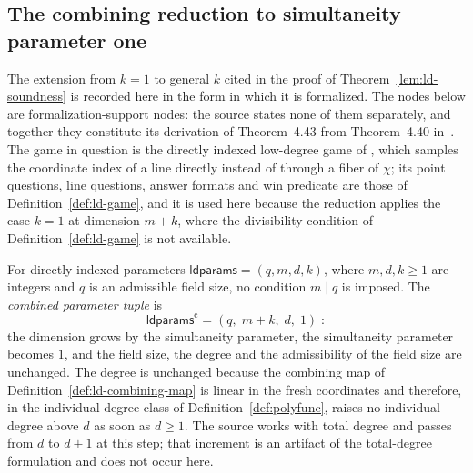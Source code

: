 \subsection{The combining reduction to simultaneity parameter one}
\label{sec:ld-combining-reduction}

The extension from $k = 1$ to general $k$ cited in the proof of
Theorem~\ref{lem:ld-soundness} is recorded here in the form in which it is
formalized.  The nodes below are formalization-support nodes: the source states
none of them separately, and together they constitute its derivation of
Theorem~4.43 from Theorem~4.40 in~\cite{Natarajan2018NEEXP}.  The game in
question is the directly indexed low-degree game of
\cite{gap:qpbt_ld-dimension-divisibility}, which samples the coordinate index of
a line directly instead of through a fiber of $\chi$; its point questions, line
questions, answer formats and win predicate are those of
Definition~\ref{def:ld-game}, and it is used here because the reduction applies
the case $k = 1$ at dimension $m + k$, where the divisibility condition of
Definition~\ref{def:ld-game} is not available.

\begin{definition}
	\label{def:ld-combining-parameters}
	\leanok
	For directly indexed parameters $\mathsf{ldparams} = (q,m,d,k)$, where
	$m,d,k \ge 1$ are integers and $q$ is an admissible field size, no condition
	$m \mid q$ is imposed.  The \emph{combined parameter tuple} is
	\[
		\mathsf{ldparams}^{\mathrm c} = (q,\; m+k,\; d,\; 1)\;:
	\]
	the dimension grows by the simultaneity parameter, the simultaneity
	parameter becomes $1$, and the field size, the degree and the admissibility
	of the field size are unchanged.  The degree is unchanged because the
	combining map of Definition~\ref{def:ld-combining-map} is linear in the
	fresh coordinates and therefore, in the individual-degree class of
	Definition~\ref{def:polyfunc}, raises no individual degree above $d$ as soon
	as $d \ge 1$.  The source works with total degree and passes from $d$ to
	$d+1$ at this step; that increment is an artifact of the total-degree
	formulation and does not occur here.
\end{definition}

